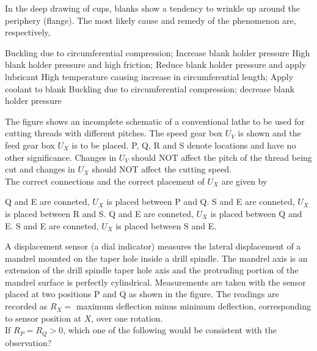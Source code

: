 \documentclass[addpoints,11pt]{exam}
\begin{document}
\begin{questions}
    \question In the deep drawing of cups, blanks show a tendency to wrinkle up around the periphery (flange). The most likely cause and remedy of the phenomenon are, respectively,\\

    \begin{choices}
        \choice Buckling due to circumferential compression; Increase blank holder pressure
        \choice High blank holder pressure and high friction; Reduce blank holder pressure and apply lubricant
        \choice High temperature causing increase in circumferential length; Apply coolant to blank
        \choice Buckling due to circumferential compression; decrease blank holder pressure
    \end{choices}

    \question The figure shows an incomplete schematic of a conventional lathe to be used for cutting threads with different pitches. The speed gear box $U_V$ is shown and the feed gear box $U_X$ is to be placed. P, Q, R and S denote locations and have no other significance. Changes in $U_V$ should NOT affect the pitch of the thread being cut and changes in $U_X$ should NOT affect the cutting speed.%
    \\The correct connections and the correct placement of $U_X$ are given by

    \begin{choices}
        \choice Q and E are conneted, $U_X$ is placed between P and Q.
        \choice S and E are conneted, $U_X$ is placed between R and S.
        \choice Q and E are conneted, $U_X$ is placed between Q and E.
        \choice S and E are conneted, $U_X$ is placed between S and E.
    \end{choices}

    \question A displacement sensor (a dial indicator) measures the lateral displacement of a mandrel mounted on the taper hole inside a drill spindle. The mandrel axis is an extension of the drill spindle taper hole axis and the protruding portion of the mandrel surface is perfectly cylindrical. Measurements are taken with the sensor placed at two positions P and Q as shown in the figure. The readings are recorded as $R_X = $ maximum deflection minus minimum deflection, corresponding to sensor position at $X$, over one rotation.%
    \\If $R_P=R_Q>0$, which one of the following would be consistent with the observation?


\end{questions}
\end{document}
